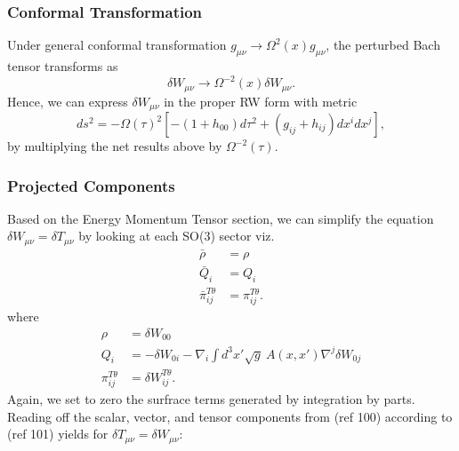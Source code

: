 \documentclass[10pt,letterpaper]{article}
\begin{document}
\subsubsection{Conformal Transformation}
Under general conformal transformation $g_{\mu\nu}\to \Omega^2(x)g_{\mu\nu}$, the perturbed Bach tensor transforms as
\begin{equation}
\delta W_{\mu\nu} \to \Omega^{-2}(x) \delta W_{\mu\nu}.
\end{equation}
Hence, we can express $\delta W_{\mu\nu}$ in the proper RW form with metric
\begin{equation}
ds^2 = -\Omega(\tau)^2\left[ -(1+h_{00})d\tau^2 + (g_{ij}+h_{ij})dx^i dx^j\right],
\end{equation}
by multiplying the net results above by $\Omega^{-2}(\tau)$. 
\subsubsection{Projected Components}
Based on the Energy Momentum Tensor section, we can simplify the equation $\delta W_{\mu\nu} = \delta T_{\mu\nu}$ by looking at each SO(3) sector viz.
\begin{align}
\bar \rho &= \rho
\nonumber\\
\bar Q_i & = Q_i
\nonumber\\
\bar\pi_{ij}^{T\theta} &= \pi_{ij}^{T\theta}.
\end{align}
where
\begin{align}
\rho &= \delta W_{00}
\nonumber \\
Q_i &= -\delta W_{0i} - \nabla_i \int d^3x' \sqrt g\ A(x,x') \nabla^j \delta W_{0j}
\nonumber\\
\pi_{ij}^{T\theta} &= \delta W_{ij}^{T\theta}.
\end{align}
Again, we set to zero the surfrace terms generated by integration by parts. Reading off the scalar, vector, and tensor components from (ref 100) according to (ref 101) yields for $\delta T_{\mu\nu} = \delta W_{\mu\nu}$:
\end{document}
